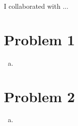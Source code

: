 \documentclass{article}
\begin{document}
I collaborated with ...

\section*{Problem 1}
\textbf{}

\begin{enumerate}[(a), wide, labelwidth=!, labelindent=0pt]
    \item \textbf{}
\end{enumerate}

\newpage
\section*{Problem 2}

\textbf{}
\begin{enumerate}[(a), wide, labelwidth=!, labelindent=0pt]
    \item \textbf{}
\end{enumerate}
\end{document}
